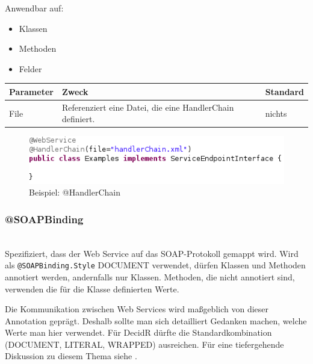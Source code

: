 \documentclass[runningheads]{llncs}
\newcommand{\germanquote}[1]{\glqq{}#1\grqq{}}
\newcommand{\decidr}{DecidR}
\newcommand{\anntabwidth}{\textwidth}
\begin{document}
      \noindent{}Anwendbar auf:
      \begin{itemize}
       \item Klassen
       \item Methoden
       \item Felder\vfill
      \end{itemize}
    \begin{tabulary}{\anntabwidth}{|l|L|L|}
    \hline
    \textbf{Parameter} & \textbf{Zweck} & \textbf{Standard} \\
    \hline
      File &
      Referenziert eine Datei, die eine HandlerChain definiert. &
      nichts \\
    \hline
    \end{tabulary} \vfill
    \begin{figure}[tbh]
      \centering
      \includegraphics[width=\textwidth]{../images/AtHandlerChain.png}
      \caption{Beispiel: @HandlerChain}
      \label{fig:hc}
    \end{figure} \vfill

    \subsubsection{@SOAPBinding}\ \\
      Spezifiziert, dass der Web Service auf das SOAP-Protokoll gemappt wird. Wird als
      \texttt{@SOAPBinding.Style} \germanquote{DOCUMENT} verwendet, dürfen Klassen und Methoden
      annotiert werden, andernfalls nur Klassen. Methoden, die nicht annotiert sind, verwenden die
      für die Klasse definierten Werte.

      Die Kommunikation zwischen Web Services wird maßgeblich von dieser Annotation geprägt.
      Deshalb sollte man sich detailliert Gedanken machen, welche Werte man hier verwendet. Für
      \decidr{} dürfte die Standardkombination (DOCUMENT, LITERAL, WRAPPED) ausreichen. Für eine
      tiefergehende Diskussion zu diesem Thema siehe \cite{which_wsdl}.
\end{document}
